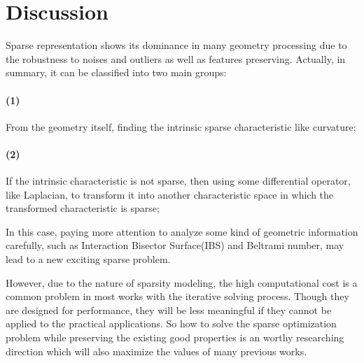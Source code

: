 \section{Discussion}
\label{sec:Discussion}

Sparse representation shows its dominance in many geometry processing due to the robustness to noises and outliers as well as features preserving.
Actually, in summary, it can be classified into two main groups:

\paragraph{(1)}
From the geometry itself, finding the intrinsic sparse characteristic like curvature;
\paragraph{(2)}
If the intrinsic characteristic is not sparse, then using some differential operator, like Laplacian, to transform it into another characteristic space in which the transformed characteristic is sparse;

In this case, paying more attention to analyze some kind of geometric information carefully, such as Interaction Bisector Surface(IBS) and Beltrami number, may lead to a new exciting sparse problem.

However, due to the nature of sparsity modeling, the high computational cost is a common problem in most works with the iterative solving process.
Though they are designed for performance, they will be less meaningful if they cannot be applied to the practical applications.
So how to solve the sparse optimization problem while preserving the existing good properties is an worthy researching direction which will also maximize the values of many previous works.


